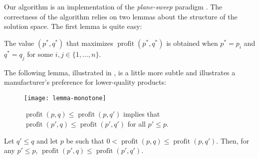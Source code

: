 \documentclass{llncs}
\newcommand{\val}{\operatorname{profit}}
\begin{document}
Our algorithm is an implementation of the \emph{plane-sweep} paradigm
\cite{bo79}. The correctness of the algorithm relies on two lemmas about
the structure of the solution space.  The first lemma is quite easy:
\begin{lem}
  The value $(p^*,q^*)$ that maximizes $\val(p^*,q^*)$ is obtained when
  $p^* = p_i$ and $q^*=q_j$ for some $i,j\in\{1,\ldots,n\}$.
\end{lem}


The following lemma, illustrated in , is a
little more subtle and illustrates a manufacturer's preference for
lower-quality products:
\begin{figure}
  \begin{center}
    \texttt{[image: lemma-monotone]}
  \end{center}
  \caption{$\val(p,q) \le \val(p,q')$ implies that $\val(p',q) \le
           \val(p',q')$ for all $p' \le p$.}
\end{figure}

\begin{lem}
  Let $q' \le q$ and let $p$ be such that $0 < \val(p,q) \le \val(p,q')$.
  Then, for any $p' \le p$, $\val(p',q) \le \val(p',q')$.
\end{lem}
\end{document}
